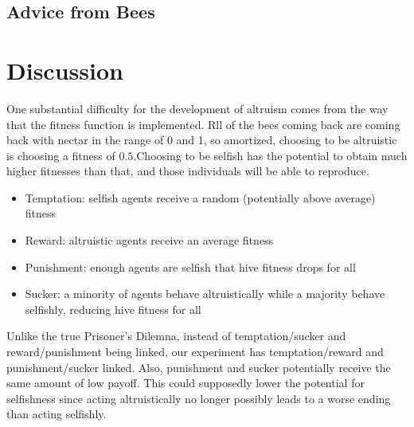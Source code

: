 \documentclass[11pt]{article}
\begin{document}
		\subsection{Advice from Bees} %
		\label{sub:advice_from_bees}


	\section{Discussion} %
	\label{sec:discussion}
		One substantial difficulty for the development of altruism comes from the way that the fitness function is implemented. Rll of the bees coming back are coming back with nectar in the range of 0 and 1, so amortized, choosing to be altruistic is choosing a fitness of $0.5$.Choosing to be selfish has the potential to obtain much higher
		fitnesses than that, and those individuals will be able to reproduce.

		\begin{itemize}
		\item Temptation: selfish agents receive a random (potentially above average) fitness
		\item Reward: altruistic agents receive an average fitness
		\item Punishment: enough agents are selfish that hive fitness drops for all
		\item Sucker: a minority of agents behave altruistically while a majority behave selfishly, reducing hive fitness for all
		\end{itemize}
		Unlike the true Prisoner's Dilemna, instead of temptation/sucker and reward/punishment being linked, our experiment has temptation/reward and punishment/sucker linked. Also, punishment and sucker potentially receive the same amount of low payoff. This could supposedly lower the potential for selfishness since acting altruistically no longer possibly leads to a worse ending than acting selfishly.

	
\end{document}
